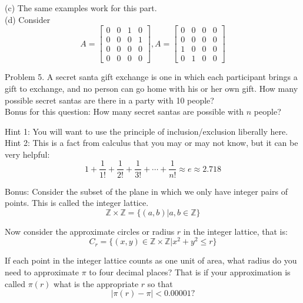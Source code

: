 \documentclass[16 pt]{amsart}
\theoremstyle{definition}
\theoremstyle{remark}
\numberwithin{equation}{subsection}
\newcommand{\Z}{\mathbb{Z}}
\begin{document}
\vspace{.25in}

(c) The same examples work for this part.\\

(d) Consider
\[
A = \begin{bmatrix}
0 & 0 & 1 & 0 \\
0 & 0 & 0 & 1 \\
0 & 0 & 0 & 0 \\
0 & 0 & 0 & 0
\end{bmatrix},
A = \begin{bmatrix}
0 & 0 & 0 & 0 \\
0 & 0 & 0 & 0 \\
1 & 0 & 0 & 0 \\
0 & 1 & 0 & 0
\end{bmatrix}
\]


\newpage

Problem 5. A secret santa gift exchange is one in which each participant brings a gift to exchange, and no person can go home with his or her own gift. How many possible secret santas are there in a party with 10 people?\\
Bonus for this question:  How many secret santas are possible with $n$ people?  

\vspace{.25in}

Hint 1: You will want to use the principle of inclusion/exclusion liberally here.\\
Hint 2: This is a fact from calculus that you may or may not know, but it can be very helpful:
\[
1 + \frac{1}{1!} + \frac{1}{2!} + \frac{1}{3!} + \cdots + \frac{1}{n!} \approx e \approx 2.718
\]


\newpage

Bonus: Consider the subset of the plane in which we only have integer pairs of points.  This is called the integer lattice.
\[
\Z \times \Z = \{(a,b) | a,b\in\Z \}
\]

Now consider the approximate circles or radius $r$ in the integer lattice, that is:
\[
C_r = \{(x,y)\in \Z\times\Z | x^2+y^2 \le r\}
\]

If each point in the integer lattice counts as one unit of area, what radius do you need to approximate $\pi$ to four decimal places?  That is if your approximation is called $\pi(r)$ what is the appropriate $r$ so that
\[
|\pi(r) - \pi | < 0.00001?
\]
\end{document}
